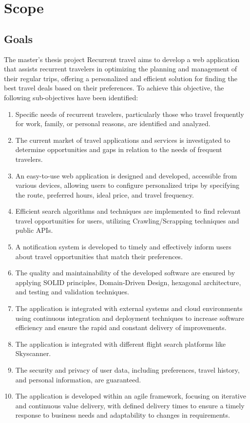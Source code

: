 \documentclass[../memory.tex]{subfiles}
\begin{document}
\section{Scope}
\subsection{Goals}
The master's thesis project Recurrent travel aims to develop a web application
that assists recurrent travelers in optimizing the planning and management of
their regular trips, offering a personalized and efficient solution for finding
the best travel deals based on their preferences. To achieve this objective, the
following sub-objectives have been identified:
\begin{enumerate}[label = -]
	\item Specific needs of recurrent travelers, particularly those who travel
	      frequently for work, family, or personal reasons, are identified and
	      analyzed.
	\item The current market of travel applications and services is investigated
	      to determine opportunities and gaps in relation to the needs of frequent
	      travelers.
	\item An easy-to-use web application is designed and developed, accessible
	      from various devices, allowing users to configure personalized trips by
	      specifying the route, preferred hours, ideal price, and travel frequency.
	\item Efficient search algorithms and techniques are implemented to find
	      relevant travel opportunities for users, utilizing Crawling/Scrapping
	      techniques and public APIs.
	\item A notification system is developed to timely and effectively inform
	      users about travel opportunities that match their preferences.
	\item The quality and maintainability of the developed software are ensured
	      by applying SOLID principles, Domain-Driven Design, hexagonal
	      architecture, and testing and validation techniques.
	\item The application is integrated with external systems and cloud
	      environments using continuous integration and deployment techniques to
	      increase software efficiency and ensure the rapid and constant delivery of
	      improvements.
	\item The application is integrated with different flight search platforms
	      like Skyscanner.
	\item The security and privacy of user data, including preferences, travel
	      history, and personal information, are guaranteed.
	\item The application is developed within an agile framework, focusing on
	      iterative and continuous value delivery, with defined delivery times to
	      ensure a timely response to business needs and adaptability to changes in
	      requirements.
\end{enumerate}
\end{document}
